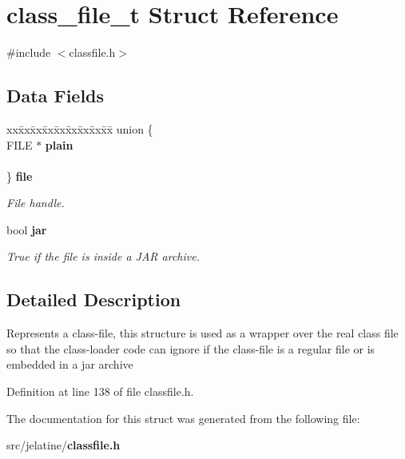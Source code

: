 \section{class\_\-file\_\-t Struct Reference}
\label{structclass__file__t}


{\ttfamily \#include $<$classfile.h$>$}

\subsection*{Data Fields}
\begin{DoxyCompactItemize}
\item 
\begin{tabbing}
xx\=xx\=xx\=xx\=xx\=xx\=xx\=xx\=xx\=\kill
union \{\\
\>FILE $\ast$ {\bf plain}\\
\>\\
\} {\bf file}\label{structclass__file__t_a7ca146163212adaaa17202cadf60d844}
\\

\end{tabbing}\begin{DoxyCompactList}\small\item\em File handle. \item\end{DoxyCompactList}\item 
bool {\bf jar}\label{structclass__file__t_ae3ff058bef385687f040167b3adf636d}

\begin{DoxyCompactList}\small\item\em True if the file is inside a JAR archive. \item\end{DoxyCompactList}\end{DoxyCompactItemize}


\subsection{Detailed Description}
Represents a class-\/file, this structure is used as a wrapper over the real class file so that the class-\/loader code can ignore if the class-\/file is a regular file or is embedded in a jar archive 

Definition at line 138 of file classfile.h.



The documentation for this struct was generated from the following file:\begin{DoxyCompactItemize}
\item 
src/jelatine/{\bf classfile.h}\end{DoxyCompactItemize}

